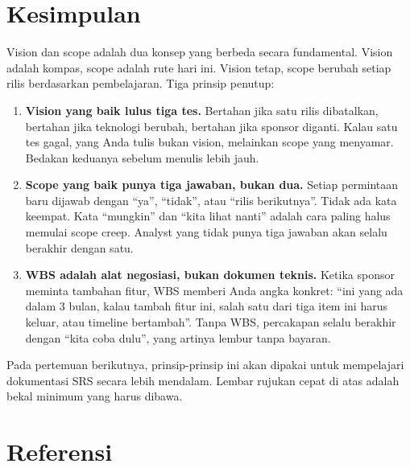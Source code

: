 \documentclass[11pt,a4paper]{article}
\begin{document}
\section{Kesimpulan}

Vision dan scope adalah dua konsep yang berbeda secara fundamental. Vision adalah kompas, scope adalah rute hari ini. Vision tetap, scope berubah setiap rilis berdasarkan pembelajaran. Tiga prinsip penutup:

\begin{enumerate}
	\item \textbf{Vision yang baik lulus tiga tes.} Bertahan jika satu rilis dibatalkan, bertahan jika teknologi berubah, bertahan jika sponsor diganti. Kalau satu tes gagal, yang Anda tulis bukan vision, melainkan scope yang menyamar. Bedakan keduanya sebelum menulis lebih jauh.
	\item \textbf{Scope yang baik punya tiga jawaban, bukan dua.} Setiap permintaan baru dijawab dengan ``ya'', ``tidak'', atau ``rilis berikutnya''. Tidak ada kata keempat. Kata ``mungkin'' dan ``kita lihat nanti'' adalah cara paling halus memulai scope creep. Analyst yang tidak punya tiga jawaban akan selalu berakhir dengan satu.
	\item \textbf{WBS adalah alat negosiasi, bukan dokumen teknis.} Ketika sponsor meminta tambahan fitur, WBS memberi Anda angka konkret: ``ini yang ada dalam 3 bulan, kalau tambah fitur ini, salah satu dari tiga item ini harus keluar, atau timeline bertambah''. Tanpa WBS, percakapan selalu berakhir dengan ``kita coba dulu'', yang artinya lembur tanpa bayaran.
\end{enumerate}

Pada pertemuan berikutnya, prinsip-prinsip ini akan dipakai untuk mempelajari dokumentasi SRS secara lebih mendalam. Lembar rujukan cepat di atas adalah bekal minimum yang harus dibawa.

\newpage
\section*{Referensi}
\end{document}
